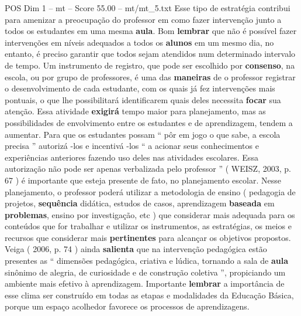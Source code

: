 \begin{textsample}{POS Dim 1 – mt – Score 55.00 – mt/mt\_5.txt}
Esse tipo de estratégia contribui para amenizar a preocupação do professor em como fazer intervenção junto a todos os estudantes em uma mesma \textbf{aula}.
Bom \textbf{lembrar} que não é possível fazer intervenções em níveis adequados a todos os \textbf{alunos} em um mesmo dia, no entanto, é preciso garantir que todos sejam atendidos num determinado intervalo de tempo.
Um instrumento de registro, que pode ser escolhido por \textbf{consenso}, na escola, ou por grupo de professores, é uma das \textbf{maneiras} de o professor registrar o desenvolvimento de cada estudante, com os quais já fez intervenções mais pontuais, o que lhe possibilitará identificarem quais deles necessita \textbf{focar} sua atenção.
Essa atividade \textbf{exigirá} tempo maior para planejamento, mas as possibilidades de envolvimento entre os estudantes e de aprendizagem, tendem a aumentar.
Para que os estudantes possam “ pôr em jogo o que sabe, a escola precisa ” autorizá -los e incentivá -los “ a acionar seus conhecimentos e experiências anteriores fazendo uso deles nas atividades escolares.
Essa autorização não pode ser apenas verbalizada pelo professor ” ( WEISZ, 2003, p. 67 ) é importante que esteja presente de fato, no planejamento escolar.
Nesse planejamento, o professor poderá utilizar a metodologia de ensino ( pedagogia de projetos, \textbf{sequência} didática, estudos de casos, aprendizagem \textbf{baseada} em \textbf{problemas}, ensino por investigação, etc ) que considerar mais adequada para os conteúdos que for trabalhar e utilizar os instrumentos, as estratégias, os meios e recursos que considerar mais \textbf{pertinentes} para alcançar os objetivos propostos.
Veiga ( 2006, p. 74 ) ainda \textbf{salienta} que na intervenção pedagógica estão presentes as “ dimensões pedagógica, criativa e lúdica, tornando a sala de \textbf{aula} sinônimo de alegria, de curiosidade e de construção coletiva ”, propiciando um ambiente mais efetivo à aprendizagem.
Importante \textbf{lembrar} a importância de esse clima ser construído em todas as etapas e modalidades da Educação Básica, porque um espaço acolhedor favorece os processos de aprendizagens.

\end{textsample}
